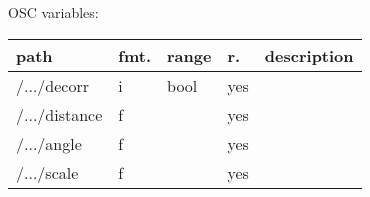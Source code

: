 \begin{snugshade}
{\footnotesize
\label{osctab:receivermodortf}
OSC variables:
\nopagebreak

\begin{tabularx}{\textwidth}{llllX}
\hline
path & fmt. & range & r. & description\\
\hline
/.../decorr & i & bool & yes & \\
/.../distance & f &  & yes & \\
/.../angle & f &  & yes & \\
/.../scale & f &  & yes & \\
\hline
\end{tabularx}
}
\end{snugshade}
